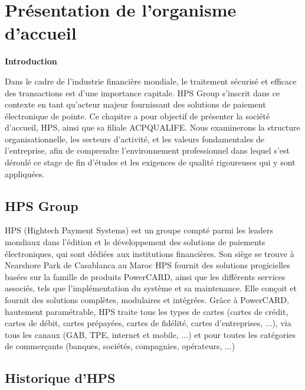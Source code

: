 \newpage
\setcounter{chapter}{0}
\chapter{Présentation de l'organisme d'accueil}
\vspace{1cm}
\minitoc
\newpage

\textbf{Introduction}

Dans le cadre de l'industrie financière mondiale, le traitement sécurisé et efficace des transactions est d'une importance capitale. HPS Group s'inscrit dans ce contexte en tant qu'acteur majeur fournissant des solutions de paiement électronique de pointe. Ce chapitre a pour objectif de présenter la société d'accueil, HPS, ainsi que sa filiale ACPQUALIFE. Nous examinerons la structure organisationnelle, les secteurs d'activité, et les valeurs fondamentales de l'entreprise, afin de comprendre l'environnement professionnel dans lequel s'est déroulé ce stage de fin d'études et les exigences de qualité rigoureuses qui y sont appliquées.
\vspace{10pt}

\section{HPS Group}

HPS (Hightech Payment Systems) est un groupe compté parmi les leaders mondiaux dans l'édition et le développement des solutions de paiements électroniques, qui sont dédiées aux institutions financières. Son siège se trouve à Nearshore Park de Casablanca au Maroc HPS fournit des solutions progicielles basées sur la famille de produits PowerCARD, ainsi que les différents services associés, tels que l'implémentation du système et sa maintenance. Elle conçoit et fournit des solutions complètes, modulaires et intégrées. Grâce à PowerCARD, hautement paramétrable, HPS traite tous les types de cartes (cartes de crédit, cartes de débit, cartes prépayées, cartes de fidélité, cartes d'entreprises, ...), via tous les canaux (GAB, TPE, internet et mobile, ...) et pour toutes les catégories de commerçants (banques, sociétés, compagnies, opérateurs, ...)

\section{Historique d'HPS}

